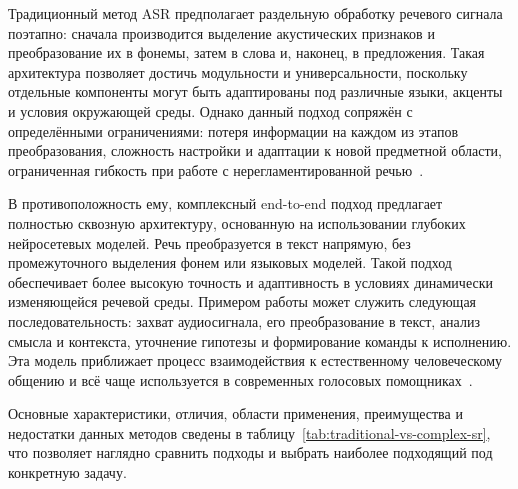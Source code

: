 Традиционный метод ASR предполагает раздельную обработку речевого сигнала поэтапно: сначала производится выделение акустических признаков и преобразование их в фонемы, затем в слова и, наконец, в предложения. Такая архитектура позволяет достичь модульности и универсальности, поскольку отдельные компоненты могут быть адаптированы под различные языки, акценты и условия окружающей среды. Однако данный подход сопряжён с определёнными ограничениями: потеря информации на каждом из этапов преобразования, сложность настройки и адаптации к новой предметной области, ограниченная гибкость при работе с нерегламентированной речью~\cite{Khlopenkova}.

В противоположность ему, комплексный end-to-end подход предлагает полностью сквозную архитектуру, основанную на использовании глубоких нейросетевых моделей. Речь преобразуется в текст напрямую, без промежуточного выделения фонем или языковых моделей. Такой подход обеспечивает более высокую точность и адаптивность в условиях динамически изменяющейся речевой среды. Примером работы может служить следующая последовательность: захват аудиосигнала, его преобразование в текст, анализ смысла и контекста, уточнение гипотезы и формирование команды к исполнению. Эта модель приближает процесс взаимодействия к естественному человеческому общению и всё чаще используется в современных голосовых помощниках~\cite{Abougarair}.

Основные характеристики, отличия, области применения, преимущества и недостатки данных методов сведены в таблицу~\ref{tab:traditional-vs-complex-sr}, что позволяет наглядно сравнить подходы и выбрать наиболее подходящий под конкретную задачу.

